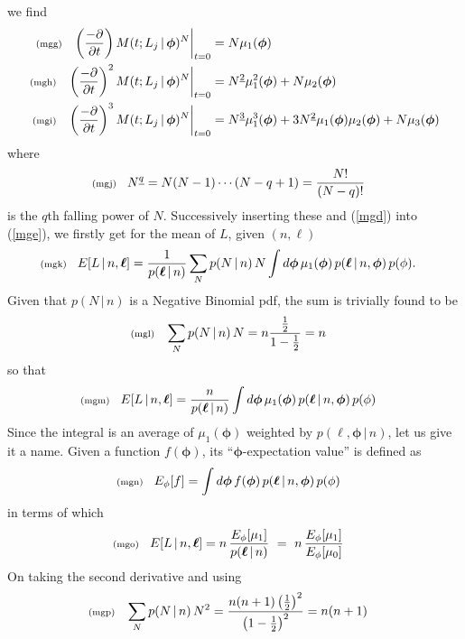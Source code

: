 \documentclass[11pt]{article}
\newcommand{\lleq}[1]{\label{#1} }
\renewcommand{\lleq}[1]{\label{#1} {\scriptstyle {\rm (#1)}} \hspace*{2ex} }
\newcommand{\cond}{\,|\,}
\newcommand{\bml}{{\bm{\ell}}}
\newcommand{\bmphi}{{\bm{\phi}}}
\begin{document}
we find
\begin{align}
  \lleq{mgg}
  \left(\frac{-\partial}{\partial t}\right) %
  M(t; L_j\cond \bmphi)^N\biggr|_{t=0}
  &= N \mu_1(\bmphi)\\
  \lleq{mgh}
  \left(\frac{-\partial}{\partial t}\right)^2 %
  M(t; L_j\cond \bmphi)^N\biggr|_{t=0}
  &= N^{\underline{2}}\mu_1^2(\bmphi) + N \mu_2(\bmphi) \\
  \lleq{mgi}
  \left(\frac{-\partial}{\partial t}\right)^3 %
  M(t; L_j\cond \bmphi)^N\biggr|_{t=0}
  &= N^{\underline{3}}\mu_1^3(\bmphi) + 3N^{\underline{2}}\mu_1(\bmphi)\mu_2(\bmphi)
  + N\mu_3(\bmphi)
\end{align}
where
\begin{align}
  \lleq{mgj}
  N^{\underline q} &= N(N-1)\cdots (N-q+1) = \frac{N!}{(N-q)!}
\end{align}
is the $q$th falling power of $N$. Successively inserting these and
(\ref{mgd}) into (\ref{mge}), we firstly get for the mean of $L$,
given $(n,\bml)$
\begin{align}
  \lleq{mgk}
  E[L\cond n,\bml]
  &= \frac{1}{p(\bml\cond n)}
  \sum_N p(N\cond n)\,N \int d\bmphi\, \mu_1(\bmphi) \,
  p(\bml\cond n,\bmphi) \, p(\phi).
\end{align}
Given that $p(N\cond n)$ is a Negative Binomial pdf, the sum is trivially
found to be
\begin{align}
  \lleq{mgl}
  \sum_N p(N\cond n)\,N &= n\frac{\tfrac{1}{2}}{1-\tfrac{1}{2}} = n
\end{align}
so that
\begin{align}
  \lleq{mgm}
  E[L\cond n,\bml]
  &= \frac{n}{p(\bml\cond n)}
  \int d\bmphi\, \mu_1(\bmphi) \, p(\bml\cond n,\bmphi) \, p(\phi)
\end{align}
Since the integral is an average of $\mu_1(\bmphi)$ weighted by
$p(\bml,\bmphi\cond n)$, let us give it a name. Given a function
$f(\bmphi)$, its ``$\bmphi$-expectation value'' is defined as
\begin{align}
  \lleq{mgn}
  E_\phi[ f ] &= \int d\bmphi\, f(\bmphi) \, p(\bml\cond n,\bmphi) \, p(\phi)
\end{align}
in terms of which
\begin{align}
  \lleq{mgo}
  E[L\cond n,\bml]
  &= n\, \frac{E_\phi[\mu_1]}{p(\bml\cond n)}
  \ =\ n\,\frac{E_\phi[\mu_1]}{E_\phi[\mu_0]}
\end{align}
On taking the second derivative and using
\begin{align}
  \lleq{mgp}
  \sum_N p(N\cond n)\,N^2
  &= \frac{n(n+1)\left(\tfrac{1}{2}\right)^2}{\left(1-\tfrac{1}{2}\right)^2}
  = n(n+1)
\end{align}
\end{document}
